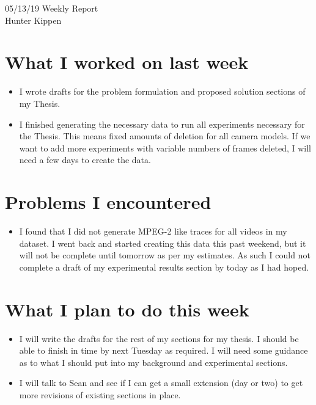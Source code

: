 \documentclass[12pt]{article}%
\def\bi{\begin{itemize}     %
\vspace{-0.5em}\setlength\itemsep{0em}}
\begin{document}
\begin{center}
{\LARGE 05/13/19 Weekly Report}\\
\vspace{0.5em}
{\Large Hunter Kippen}
\vspace{0.5em}
\end{center}


\section{What I worked on last week}
\bi
\item I wrote drafts for the problem formulation and proposed solution sections of my Thesis.
\item I finished generating the necessary data to run all experiments necessary for the Thesis. This means fixed amounts of deletion for all camera models. If we want to add more experiments with variable numbers of frames deleted, I will need a few days to create the data.
\end{itemize}

\section{Problems I encountered}
\bi
\item I found that I did not generate MPEG-2 like traces for all videos in my dataset. I went back and started creating this data this past weekend, but it will not be complete until tomorrow as per my estimates. As such I could not complete a draft of my experimental results section by today as I had hoped.
\end{itemize}

\section{What I plan to do this week}
\bi
\item I will write the drafts for the rest of my sections for my thesis. I should be able to finish in time by next Tuesday as required. I will need some guidance as to what I should put into my background and experimental sections.
\item I will talk to Sean and see if I can get a small extension (day or two) to get more revisions of existing sections in place.
\end{itemize}



\begin{comment}
\pagebreak
%


%
\end{comment}
\end{document}

